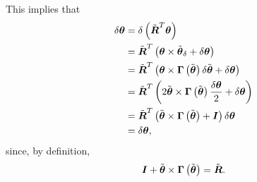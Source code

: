 \documentclass[10pt,dvips,fleqn,subeqn]{report}
\newcommand{\T}[1]{\boldsymbol{#1}}
\begin{document}
This implies that
\begin{align}
	\delta\T{\theta}
	&= \delta\plbr{\tilde{\T{R}}^T \T{\theta}}
	\nonumber \\
	&= \tilde{\T{R}}^T \plbr{
		\T{\theta} \times \tilde{\T{\theta}}_{\delta}
		+ \delta\T{\theta}
	}
	\nonumber \\
	&= \tilde{\T{R}}^T \plbr{
		\T{\theta} \times \T{\Gamma}\plbr{\tilde{\T{\theta}}} \delta\tilde{\T{\theta}}
		+ \delta\T{\theta}
	}
	\nonumber \\
	&= \tilde{\T{R}}^T \plbr{
		2 \tilde{\T{\theta}} \times \T{\Gamma}\plbr{\tilde{\T{\theta}}} \frac{\delta\T{\theta}}{2}
		+ \delta\T{\theta}
	}
	\nonumber \\
	&= \tilde{\T{R}}^T \plbr{
		\tilde{\T{\theta}} \times \T{\Gamma}\plbr{\tilde{\T{\theta}}}
		+ \T{I}
	} \delta\T{\theta}
	\nonumber \\
	&= \delta\T{\theta} ,
\end{align}
since, by definition,
\begin{equation}
	\T{I} + \tilde{\T{\theta}} \times \T{\Gamma}\plbr{\tilde{\T{\theta}}} = \tilde{\T{R}} .
\end{equation}

\begin{comment}
The perturbation of the relative orientation $\T{\theta}$, 
projected in the intermediate reference frame,
\begin{equation}
	\delta\overline{\T{\theta}} = \tilde{\T{R}}^T \delta\T{\theta} ,
\end{equation}
is used as perturbation of the measure of the straining of the joint,
resulting in
\begin{align}
	\delta\overline{\T{\theta}}
	&= \tilde{\T{R}}^T \delta\T{\theta}
	\nonumber \\
	&= \tilde{\T{R}}^T \T{\Gamma}\plbr{\T{\theta}}^{-1} \T{R}_{1h}^T \plbr{\T{\theta}_{2\delta} - \T{\theta}_{1\delta}}
	\nonumber \\
	&= \tilde{\T{R}}^T \T{\Gamma}\plbr{\T{\theta}}^{-1} \tilde{\T{R}} \hat{\T{R}}^T \plbr{\T{\theta}_{2\delta} - \T{\theta}_{1\delta}}
	\nonumber \\
	&= \T{\Gamma}\plbr{\T{\theta}}^{-1} \hat{\T{R}}^T \plbr{\T{\theta}_{2\delta} - \T{\theta}_{1\delta}}
\end{align}
where the last substitution exploits the property
\begin{align}
	\tilde{\T{R}}^T \T{\Gamma}\plbr{\T{\theta}}^{-1} \tilde{\T{R}}
	&= \tilde{\T{R}}^{-1} \T{\Gamma}\plbr{\T{\theta}}^{-1} \tilde{\T{R}}^{-T} 
	\nonumber \\
	&= \plbr{
		\tilde{\T{R}}^T \T{\Gamma}\plbr{\T{\theta}} \tilde{\T{R}}
	}^{-1} 
	\nonumber \\
	&= \T{\Gamma}\plbr{\tilde{\T{R}}^T \T{\theta}}^{-1} 
	\nonumber \\
	&= \T{\Gamma}\plbr{\T{\theta}}^{-1} .
\end{align}
\end{comment}
\end{document}
